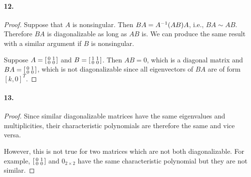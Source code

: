   \paragraph{12.}
  \begin{proof}
    Suppose that $A$ is nonsingular. Then $BA=A^{-1}(AB)A$, i.e., $BA\sim AB$.
    Therefore $BA$ is diagonalizable as long as $AB$ is. We can produce the same
    result with a similar argument if $B$ is nonsingular.\par
    Suppose $A=\begin{bsmallmatrix}0 & 1 \\ 0 & 0\end{bsmallmatrix}$ and $B=
    \begin{bsmallmatrix} 1 & 1 \\ 0 & 0\end{bsmallmatrix}$. Then $AB=0$, which 
    is a diagonal matrix and $BA=\begin{bsmallmatrix} 0 & 1 \\ 0 & 0
    \end{bsmallmatrix}$, which is not diagonalizable since all eigenvectors of 
    $BA$ are of form $[k, 0]^T$.
  \end{proof}

  \paragraph{13.}
  \begin{proof}
    Since similar diagonalizable matrices have the same eigenvalues and 
    multiplicities, their characteristic polynomials are therefore the same and
    vice versa.\par
    However, this is not true for two matrices which are not both 
    diagonalizable. For example, $\begin{bsmallmatrix} 0 & 1 \\ 0 & 0 
    \end{bsmallmatrix}$ and $0_{2\times 2}$ have the same characteristic 
    polynomial but they are not similar.
  \end{proof}

